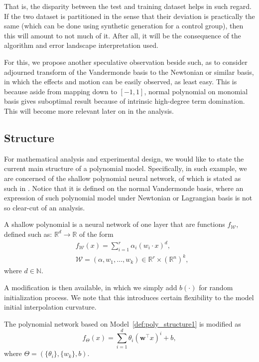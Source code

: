 \documentclass[
  journal=largetwo,
  year=2025,
  volume=37,
]{cup-journal}
\begin{document}
That is, the disparity between the test and training dataset helps in such regard. If the two dataset is partitioned in the sense that their deviation is practically the same (which can be done using synthetic generation for a control group), then this will amount to not much of it. After all, it will be the consequence of the algorithm and error landscape interpretation used. 

For this, we propose another speculative observation beside such, as to consider adjourned transform of the Vandermonde basis to the Newtonian or similar basis, in which the effects and motion can be easily observed, as least easy. This is because aside from mapping down to $[-1,1]$, normal polynomial on monomial basis gives suboptimal result because of intrinsic high-degree term domination. This will become more relevant later on in the analysis. 

\subsection{Structure}

For mathematical analysis and experimental design, we would like to state the current main structure of a polynomial model. Specifically, in such example, we are concerned of the shallow polynomial neural network, of which is stated as such in \cite{arjevani2025geometryoptimizationshallowpolynomial}. Notice that it is defined on the normal Vandermonde basis, where an expression of such polynomial model under Newtonian or Lagrangian basis is not so clear-cut of an analysis. 

\begin{definition}\label{def:poly_structure1}
    A shallow polynomial is a neural network of one layer that are functions $f_{\mathcal W}$, defined such as:
$\mathbb R^d \rightarrow \mathbb{R}$ of the form
\begin{equation}\label{eq:network_model} 
    \begin{split}
        &f_{\mathcal W}(x) = \sum_{i=1}^r
\alpha_{i} (w_i \cdot x)^d,\\  
&\mathcal W = (\alpha,w_1,\ldots,w_k) \in
\mathbb{R}^r \times (\mathbb{R}^{n})^k,
    \end{split}
\end{equation} 
where $d \in \mathbb{N}$.
\end{definition}

A modification is then available, in which we simply add $b(\cdot)$ for random initialization process. We note that this introduces certain flexibility to the model initial interpolation curvature.   
\begin{definition}\label{def:poly_model_test}
    The polynomial network based on Model~\ref{def:poly_structure1} is modified as 
    \begin{equation}
        f_{\Theta}(x) = \sum_{i=1}^{d} \theta_i \left( \mathbf{w}^\top x \right)^i + b,
    \end{equation}
    where $\Theta = (\{\theta_{i}\},\{w_{k}\},b)$.
\end{definition}
\end{document}
